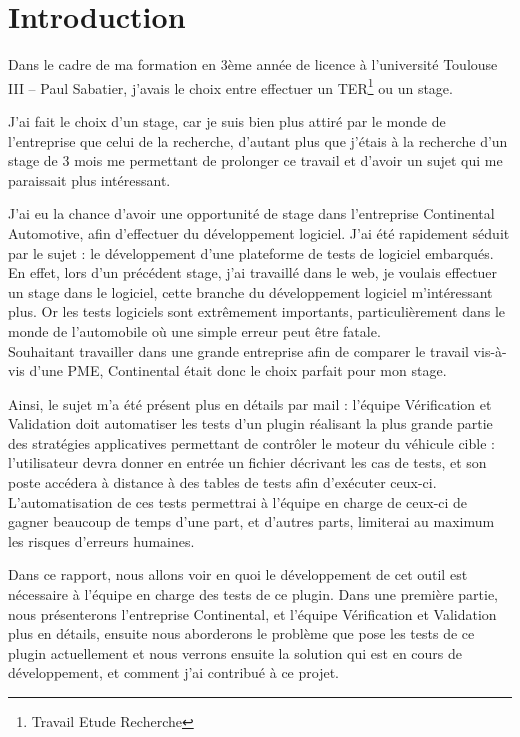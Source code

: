 \chapter*{Introduction}
	Dans le cadre de ma formation en 3ème année de licence à l'université Toulouse III -- Paul Sabatier, j'avais le choix entre effectuer un TER\footnote{Travail Etude Recherche} ou un stage.

	J'ai fait le choix d'un stage, car je suis bien plus attiré par le monde de l'entreprise que celui de la recherche, d'autant plus que j'étais à la recherche d'un stage de 3 mois me permettant de prolonger ce travail et d'avoir un sujet qui me paraissait plus intéressant.

	J'ai eu la chance d'avoir une opportunité de stage dans l'entreprise Continental Automotive, afin d'effectuer du développement logiciel. J'ai été rapidement séduit par le sujet : le développement d'une plateforme de tests de logiciel embarqués. En effet, lors d'un précédent stage, j'ai travaillé dans le web, je voulais effectuer un stage dans le logiciel, cette branche du développement logiciel m'intéressant plus. Or les tests logiciels sont extrêmement importants, particulièrement dans le monde de l'automobile où une simple erreur peut être fatale.\\
	Souhaitant travailler dans une grande entreprise afin de comparer le travail vis-à-vis d'une PME, Continental était donc le choix parfait pour mon stage.

	Ainsi, le sujet m'a été présent plus en détails par mail : l'équipe Vérification et Validation doit automatiser les tests d'un plugin réalisant la plus grande partie des stratégies applicatives permettant de contrôler le moteur du véhicule cible : l'utilisateur devra donner en entrée un fichier décrivant les cas de tests, et son poste accédera à distance à des tables de tests afin d'exécuter ceux-ci.\\
	L'automatisation de ces tests permettrai à l'équipe en charge de ceux-ci de gagner beaucoup de temps d'une part, et d'autres parts, limiterai au maximum les risques d'erreurs humaines.

	Dans ce rapport, nous allons voir en quoi le développement de cet outil est nécessaire à l'équipe en charge des tests de ce plugin. Dans une première partie, nous présenterons l'entreprise Continental, et l'équipe Vérification et Validation plus en détails, ensuite nous aborderons le problème que pose les tests de ce plugin actuellement et nous verrons ensuite la solution qui est en cours de développement, et comment j'ai contribué à ce projet.
